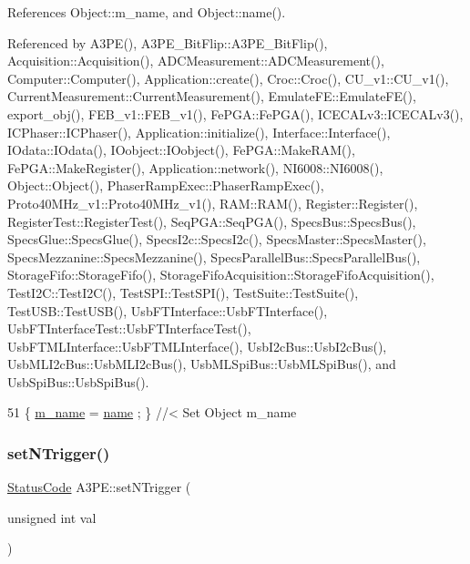 References Object\+::m\+\_\+name, and Object\+::name().



Referenced by A3\+P\+E(), A3\+P\+E\+\_\+\+Bit\+Flip\+::\+A3\+P\+E\+\_\+\+Bit\+Flip(), Acquisition\+::\+Acquisition(), A\+D\+C\+Measurement\+::\+A\+D\+C\+Measurement(), Computer\+::\+Computer(), Application\+::create(), Croc\+::\+Croc(), C\+U\+\_\+v1\+::\+C\+U\+\_\+v1(), Current\+Measurement\+::\+Current\+Measurement(), Emulate\+F\+E\+::\+Emulate\+F\+E(), export\+\_\+obj(), F\+E\+B\+\_\+v1\+::\+F\+E\+B\+\_\+v1(), Fe\+P\+G\+A\+::\+Fe\+P\+G\+A(), I\+C\+E\+C\+A\+Lv3\+::\+I\+C\+E\+C\+A\+Lv3(), I\+C\+Phaser\+::\+I\+C\+Phaser(), Application\+::initialize(), Interface\+::\+Interface(), I\+Odata\+::\+I\+Odata(), I\+Oobject\+::\+I\+Oobject(), Fe\+P\+G\+A\+::\+Make\+R\+A\+M(), Fe\+P\+G\+A\+::\+Make\+Register(), Application\+::network(), N\+I6008\+::\+N\+I6008(), Object\+::\+Object(), Phaser\+Ramp\+Exec\+::\+Phaser\+Ramp\+Exec(), Proto40\+M\+Hz\+\_\+v1\+::\+Proto40\+M\+Hz\+\_\+v1(), R\+A\+M\+::\+R\+A\+M(), Register\+::\+Register(), Register\+Test\+::\+Register\+Test(), Seq\+P\+G\+A\+::\+Seq\+P\+G\+A(), Specs\+Bus\+::\+Specs\+Bus(), Specs\+Glue\+::\+Specs\+Glue(), Specs\+I2c\+::\+Specs\+I2c(), Specs\+Master\+::\+Specs\+Master(), Specs\+Mezzanine\+::\+Specs\+Mezzanine(), Specs\+Parallel\+Bus\+::\+Specs\+Parallel\+Bus(), Storage\+Fifo\+::\+Storage\+Fifo(), Storage\+Fifo\+Acquisition\+::\+Storage\+Fifo\+Acquisition(), Test\+I2\+C\+::\+Test\+I2\+C(), Test\+S\+P\+I\+::\+Test\+S\+P\+I(), Test\+Suite\+::\+Test\+Suite(), Test\+U\+S\+B\+::\+Test\+U\+S\+B(), Usb\+F\+T\+Interface\+::\+Usb\+F\+T\+Interface(), Usb\+F\+T\+Interface\+Test\+::\+Usb\+F\+T\+Interface\+Test(), Usb\+F\+T\+M\+L\+Interface\+::\+Usb\+F\+T\+M\+L\+Interface(), Usb\+I2c\+Bus\+::\+Usb\+I2c\+Bus(), Usb\+M\+L\+I2c\+Bus\+::\+Usb\+M\+L\+I2c\+Bus(), Usb\+M\+L\+Spi\+Bus\+::\+Usb\+M\+L\+Spi\+Bus(), and Usb\+Spi\+Bus\+::\+Usb\+Spi\+Bus().


\begin{DoxyCode}
51 \{ \hyperlink{classObject_a8b83c95c705d2c3ba0d081fe1710f48d}{m\_name}  = \hyperlink{classObject_a300f4c05dd468c7bb8b3c968868443c1}{name}  ; \} \textcolor{comment}{//< Set Object m\_name}
\end{DoxyCode}
\mbox{\label{classA3PE_a81db44ddfc42b67ed08756b113b8e122}} 
\subsubsection{\texorpdfstring{set\+N\+Trigger()}{setNTrigger()}}
{\footnotesize\ttfamily \hyperlink{classStatusCode}{Status\+Code} A3\+P\+E\+::set\+N\+Trigger (\begin{DoxyParamCaption}\item[{unsigned int}]{val }\end{DoxyParamCaption})}



